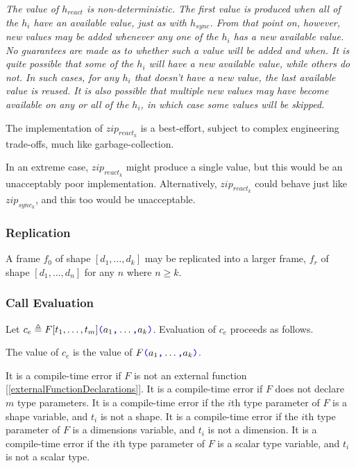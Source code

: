 \documentclass{article}
\begin{document}
{\em
The value of $h_{react}$ is non-deterministic. The first value is produced when all of the $h_i$ have an available value, just as with $h_{sync}$. From that point on, however,
new values may be added whenever any one of the $h_i$ has a new available value. No guarantees are made as to whether such a value will be added and when. It is quite possible that some of the $h_i$ will have a new available value, while others do not. In such cases, for any $h_i$ that doesn't have a new value,  the last available value is reused.
It is also possible that multiple new values may have become available on any or all of the $h_i$, in which case some values will be skipped.

The implementation of $zip_{react_k}$ is a best-effort, subject to complex engineering trade-offs, much like garbage-collection.

In an extreme case, $zip_{react_k}$ might produce a single value, but this would be an unacceptably poor implementation. Alternatively, $zip_{react_k}$ could behave just like 
$zip_{sync_k}$, and this too would be unacceptable.
}

\subsubsection{Replication}
\label{replication}

A frame $f_0$ of shape $[d_1, \ldots, d_k]$ may be replicated into a larger frame, $f_r$ of shape $[d_1, \ldots, d_n]$ for any $n$ where $n \ge k$. 




\subsubsection{Call Evaluation}
\label{callEvaluation}

Let $c_e \triangleq F[t_1, \ldots, t_m]\texttt{\color{blue} (}{}a_1\texttt{\color{blue} ,}{} \ldots\texttt{\color{blue} ,}{} a_k\texttt{\color{blue} )}$. Evaluation of $c_e$ proceeds as follows. 

The value of $c_e$ is the value of $F\texttt{\color{blue} (}{}a_1\texttt{\color{blue} ,}{} \ldots\texttt{\color{blue} ,}{} a_k\texttt{\color{blue} )}$.

It is a compile-time error if $F$ is not an external function [\ref{externalFunctionDeclarations}].
It is a compile-time error if $F$ does not declare $m$ type parameters. 
It is a compile-time error if the $i$th type parameter of $F$ is a shape variable, and $t_i$ is not a shape.
It is a compile-time error if the $i$th type parameter of $F$ is a dimensions variable, and $t_i$ is not a dimension.
It is a compile-time error if the $i$th type parameter of $F$ is a scalar type variable, and $t_i$ is not a scalar type.
\end{document}
